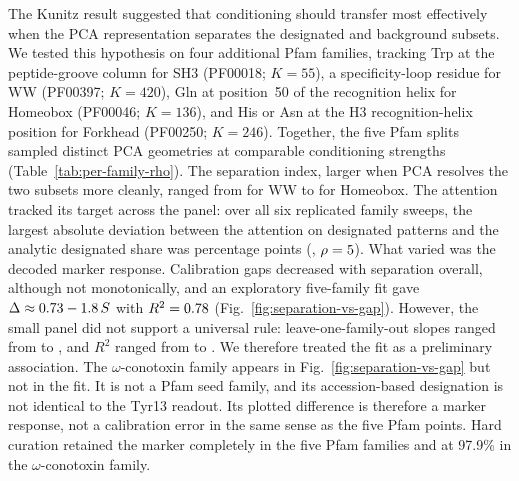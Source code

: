 The Kunitz result suggested that conditioning should transfer most effectively when the PCA
representation separates the designated and background subsets. We tested this hypothesis on
four additional Pfam families, tracking Trp at the peptide-groove column for SH3 (PF00018;
$K=55$), a specificity-loop residue for WW (PF00397; $K=420$), Gln at position~50 of the
recognition helix for Homeobox (PF00046; $K=136$), and His or Asn at the H3 recognition-helix
position for Forkhead (PF00250; $K=246$). Together, the five Pfam splits sampled distinct
PCA geometries at comparable conditioning strengths (Table~\ref{tab:per-family-rho}). The
separation index, larger when PCA resolves the two subsets more cleanly, ranged from
\WWSeparation{} for WW to \HomeoboxSeparation{} for Homeobox.
The attention tracked its target across the panel: over all six replicated family
sweeps, the largest absolute deviation between the attention on designated patterns and the
analytic designated share was \AttnMaxDevPts{} percentage points (\AttnMaxDevFamily{},
$\rho=5$). What varied was the decoded marker response.
Calibration gaps decreased with separation
overall, although not monotonically, and an exploratory five-family fit gave
$\Delta\approx0.73{} -1.8\,S$ with $R^{2}=0.78$
(Fig.~\ref{fig:separation-vs-gap}). However, the small panel did not support a universal rule:
leave-one-family-out slopes ranged from \RelationLooSlopeMin{} to \RelationLooSlopeMax{}, and
$R^{2}$ ranged from \RelationLooRsqMin{} to \RelationLooRsqMax{}. We therefore treated the fit
as a preliminary association. The $\omega$-conotoxin family appears in
Fig.~\ref{fig:separation-vs-gap} but not in the fit. It is not a Pfam seed family, and its
accession-based designation is not identical to the Tyr13 readout. Its plotted difference is
therefore a marker response, not a calibration error in the same sense as the five Pfam points.
Hard curation retained the marker completely in the five Pfam families and at 97.9\% in the
$\omega$-conotoxin family.

